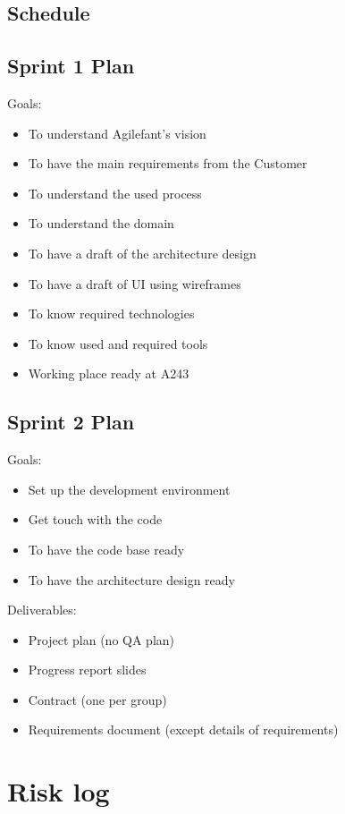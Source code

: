 \subsection{Schedule}



\subsection{Sprint 1 Plan}

Goals:
\begin{itemize}
\item To understand Agilefant's vision
\item To have the main requirements from the Customer
\item To understand the used process
\item To understand the domain
\item To have a draft of the architecture design
\item To have a draft of UI using wireframes
\item To know required technologies
\item To know used and required tools
\item Working place ready at A243
\end{itemize}

\subsection{Sprint 2 Plan}

Goals:
\begin{itemize}
\item Set up the development environment
\item Get touch with the code 
\item To have the code base ready 
\item To have the architecture design ready
\end{itemize}

\noindent Deliverables:
\begin{itemize}
\item Project plan (no QA plan)
\item Progress report slides
\item Contract (one per group)
\item Requirements document (except details of requirements)
\end{itemize}

\section{Risk log}

